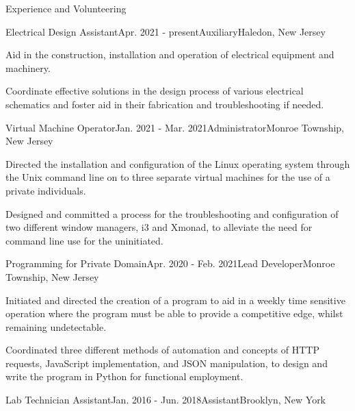 \documentclass{resume}
\begin{document}
    \begin{rSection}{Experience and Volunteering}
        \begin{rSubsection}{Electrical Design Assistant}{Apr. 2021 - present}{Auxiliary}{Haledon, New Jersey}
            \item Aid in the construction, installation and operation of
                electrical equipment and machinery.
            \item Coordinate effective solutions in the design process of
                various electrical schematics and foster aid in their
                fabrication and troubleshooting if needed.
        \end{rSubsection}
        \begin{rSubsection}{Virtual Machine Operator}{Jan. 2021 - Mar. 2021}{Administrator}{Monroe Township, New Jersey}
            \item Directed the installation and configuration of the Linux
                operating system through the Unix command line on to three
                separate virtual machines for the use of a private individuals.
            \item Designed and committed a process for the troubleshooting and
                configuration of two different window managers, i3 and Xmonad,
                to alleviate the need for command line use for the uninitiated.
        \end{rSubsection}
        \begin{rSubsection}{Programming for Private Domain}{Apr. 2020 - Feb. 2021}{Lead Developer}{Monroe Township, New Jersey}
            \item Initiated and directed the creation of a program to aid in a
                weekly time sensitive operation where the program must be able
                to provide a competitive edge, whilst remaining undetectable.
            \item Coordinated three different methods of automation and concepts of HTTP
                requests, JavaScript implementation, and JSON manipulation, to
                design and write the program in Python for functional employment.
        \end{rSubsection}
        \begin{rSubsection}{Lab Technician Assistant}{Jan. 2016 - Jun. 2018}{Assistant}{Brooklyn, New York}

\end{rSubsection}
\end{rSection}
\end{document}
